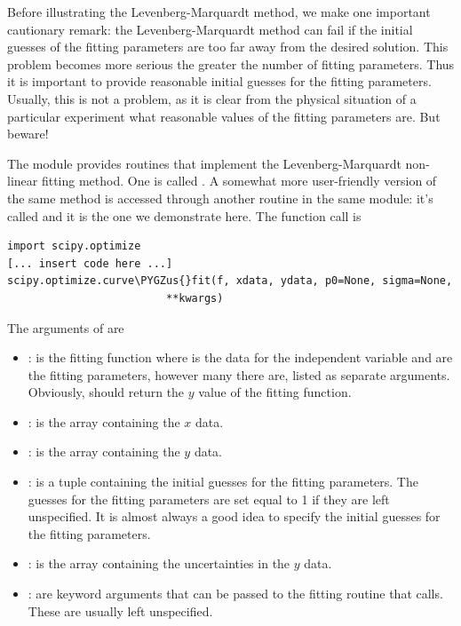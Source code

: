 \documentclass[letterpaper,10pt,english]{sphinxmanual}
\def\PYGZus{\char`\_}
\begin{document}
Before illustrating the Levenberg-Marquardt method, we make one important cautionary remark: the Levenberg-Marquardt method can fail if the initial guesses of the fitting parameters are too far away from the desired solution.  This problem becomes more serious the greater the number of fitting parameters.  Thus it is important to provide reasonable initial guesses for the fitting parameters.  Usually, this is not a problem, as it is clear from the physical situation of a particular experiment what reasonable values of the fitting parameters are.  But beware!

The  module provides routines that implement the Levenberg-Marquardt non-linear fitting method.  One is called .  A somewhat more user-friendly version of the same method is accessed through another routine in the same  module: it's called  and it is the one we demonstrate here.  The function call is

\begin{Verbatim}[commandchars=\\\{\}]
import scipy.optimize
[... insert code here ...]
scipy.optimize.curve\PYGZus{}fit(f, xdata, ydata, p0=None, sigma=None,
                         **kwargs)
\end{Verbatim}

The arguments of  are
\begin{itemize}
\item {} 
: is the fitting function where  is the data for the independent variable and  are the fitting parameters, however many there are, listed as separate arguments.  Obviously,  should return the \(y\) value of the fitting function.

\item {} 
: is the array containing the \(x\) data.

\item {} 
: is the array containing the \(y\) data.

\item {} 
: is a tuple containing the initial guesses for the fitting parameters.  The guesses for the fitting parameters are set equal to 1 if they are left unspecified.  It is almost always a good idea to specify the initial guesses for the fitting parameters.

\item {} 
: is the array containing the uncertainties in the \(y\) data.

\item {} 
: are keyword arguments that can be passed to the fitting routine  that  calls.  These are usually left unspecified.

\end{itemize}
\end{document}
